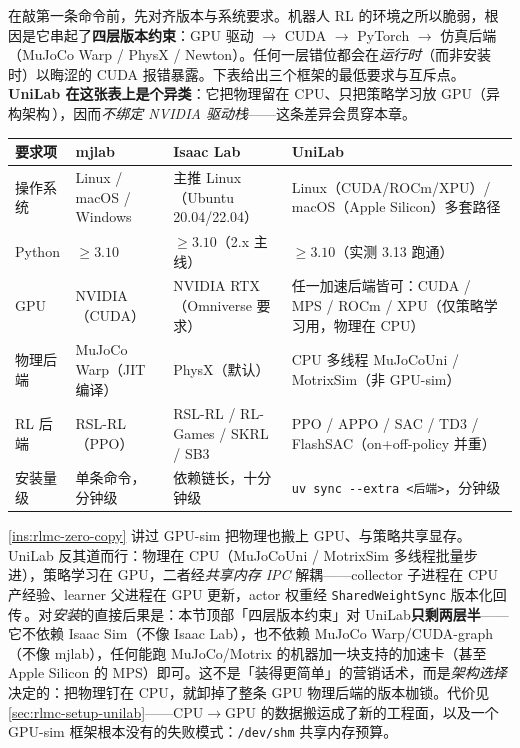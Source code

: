 在敲第一条命令前，先对齐版本与系统要求。机器人 RL 的环境之所以脆弱，根因是它串起了\textbf{四层版本约束}：GPU 驱动 $\to$ CUDA $\to$ PyTorch $\to$ 仿真后端（MuJoCo Warp / PhysX / Newton）。任何一层错位都会在\emph{运行时}（而非安装时）以晦涩的 CUDA 报错暴露。下表给出三个框架的最低要求与互斥点。\textbf{UniLab 在这张表上是个异类}：它把物理留在 CPU、只把策略学习放 GPU（异构架构\,\cite{unilab2026}），因而\emph{不绑定 NVIDIA 驱动栈}——这条差异会贯穿本章。

\begin{center}
\small
\begin{tabular}{@{}p{1.7cm}p{3.1cm}p{3.3cm}p{4.3cm}@{}}
\toprule
要求项 & mjlab & Isaac Lab & UniLab \\
\midrule
操作系统 & Linux / macOS / Windows & 主推 Linux（Ubuntu 20.04/22.04） & Linux（CUDA/ROCm/XPU）/ macOS（Apple Silicon）多套路径 \\
Python & $\ge 3.10$ & $\ge 3.10$（2.x 主线） & $\ge 3.10$（实测 3.13 跑通） \\
GPU & NVIDIA（CUDA）& NVIDIA RTX（Omniverse 要求） & 任一加速后端皆可：CUDA / MPS / ROCm / XPU（仅策略学习用，物理在 CPU） \\
物理后端 & MuJoCo Warp（JIT 编译） & PhysX（默认）& CPU 多线程 MuJoCoUni / MotrixSim（非 GPU-sim） \\
RL 后端 & RSL-RL（PPO） & RSL-RL / RL-Games / SKRL / SB3 & PPO / APPO / SAC / TD3 / FlashSAC（on+off-policy 并重） \\
安装量级 & 单条命令，分钟级 & 依赖链长，十分钟级 & \verb|uv sync --extra <后端>|，分钟级 \\
\bottomrule
\end{tabular}
\end{center}

\begin{insight}\label{ins:rlmc-unilab-heterogeneous}
\cref{ins:rlmc-zero-copy} 讲过 GPU-sim 把物理也搬上 GPU、与策略共享显存。UniLab 反其道而行：物理在 CPU（MuJoCoUni / MotrixSim 多线程批量步进），策略学习在 GPU，二者经\emph{共享内存 IPC} 解耦——collector 子进程在 CPU 产经验、learner 父进程在 GPU 更新，actor 权重经 \verb|SharedWeightSync| 版本化回传\,\cite{unilab2026}。对\emph{安装}的直接后果是：本节顶部「四层版本约束」对 UniLab\textbf{只剩两层半}——它不依赖 Isaac Sim（不像 Isaac Lab），也不依赖 MuJoCo Warp/CUDA-graph（不像 mjlab），任何能跑 MuJoCo/Motrix 的机器加一块支持的加速卡（甚至 Apple Silicon 的 MPS）即可。这不是「装得更简单」的营销话术，而是\emph{架构选择}决定的：把物理钉在 CPU，就卸掉了整条 GPU 物理后端的版本枷锁。代价见 \cref{sec:rlmc-setup-unilab}——CPU$\to$GPU 的数据搬运成了新的工程面，以及一个 GPU-sim 框架根本没有的失败模式：\verb|/dev/shm| 共享内存预算。
\end{insight}

